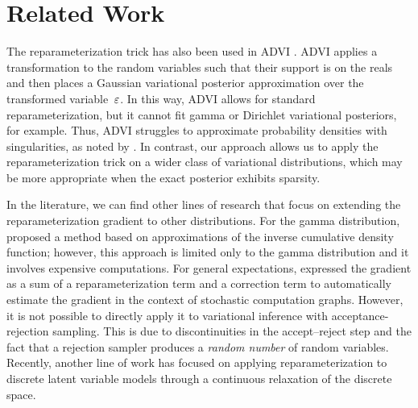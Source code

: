 \section{Related Work}\label{sec:relatedwork}
The reparameterization trick has also been used in \gls{ADVI} \citep{Kucukelbir2015,Kucukelbir2016}. \gls{ADVI} applies a transformation to the random variables such that their support is on the reals and then places a Gaussian variational posterior approximation over the transformed variable~$\varepsilon$. In this way, \gls{ADVI} allows for standard reparameterization, but it cannot fit gamma or Dirichlet variational posteriors, for example. Thus, \gls{ADVI} struggles to approximate probability densities with singularities, as noted by \citet{RuizTB2016}. In contrast, our approach allows us to apply the reparameterization trick on a wider class of variational distributions, which may be more appropriate when the exact posterior exhibits sparsity.

In the literature, we can find other lines of research that focus on extending the reparameterization gradient to other distributions. For the gamma distribution, \citet{Knowles2015} proposed a method based on approximations of the inverse cumulative density function; however, this approach is limited only to the gamma distribution and it involves expensive computations. 
For general expectations, \citet{Schulman2015} expressed the gradient as a sum of a reparameterization term and a correction term to automatically estimate the gradient %
 in the context of stochastic computation graphs. However, it is not possible to directly apply it to variational inference with acceptance-rejection sampling. This is due to discontinuities in the accept--reject step and the fact that a rejection sampler produces a \emph{random number} of random variables. %
Recently, another line of work has focused on applying reparameterization to discrete latent variable models \citep{Maddison2017,Jang2017} through a continuous relaxation of the discrete space.

